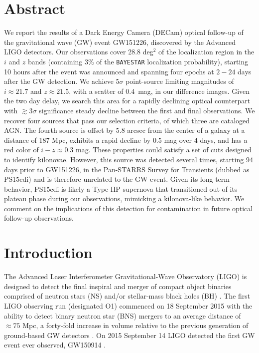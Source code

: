 \section*{Abstract}
We report the results of a Dark Energy Camera (DECam) optical follow-up of the gravitational wave (GW) event GW151226, discovered by the Advanced LIGO detectors. Our observations cover 28.8 deg$^2$ of the localization region in the $i$ and $z$ bands (containing 3\%  of the {\tt BAYESTAR} localization probability), starting 10 hours after the  event was announced and spanning four epochs at $2-24$ days after the  GW detection. We achieve $5\sigma$ point-source limiting  magnitudes of $i\approx21.7$ and $z\approx21.5$, with a scatter of $0.4$~mag, in our difference images. Given the two day delay,  we search this area for a rapidly declining optical counterpart with $\gtrsim 3\sigma$ significance steady decline between the first and final observations. We recover four sources that pass our selection criteria,  of which three are cataloged AGN. The fourth source is offset by $5.8$ arcsec from the center of a galaxy at a distance of 187 Mpc, exhibits a rapid decline by $0.5$ mag over $4$ days, and has a red color of $i-z\approx 0.3$ mag. These properties could satisfy a set of cuts designed to identify kilonovae. However, this source was detected several times, starting $94$ days prior to GW151226,   in the Pan-STARRS Survey for Transients (dubbed as PS15cdi) and is therefore unrelated to the GW event. Given its long-term  behavior, PS15cdi is likely a Type IIP supernova that  transitioned out of its plateau phase during our  observations, mimicking a kilonova-like behavior. We comment on the implications of this detection for contamination in future optical follow-up observations.

\section{Introduction}
\label{sec:ch4_intro}
The Advanced Laser Interferometer Gravitational-Wave Observatory (LIGO) is designed to detect the final inspiral and merger of compact object binaries comprised of neutron stars (NS) and/or stellar-mass black holes (BH) \citep{LIGOMainRef}.  The first LIGO observing run (designated O1) commenced on 18 September 2015 with the ability to detect binary neutron star (BNS) mergers to an average distance of $\approx 75$ Mpc, a forty-fold increase in volume relative to the previous generation of ground-based GW detectors \citep{Martynov+16}. On 2015 September 14 LIGO detected  the first GW event ever observed, GW150914 \citep{LIGOGW150914}.

